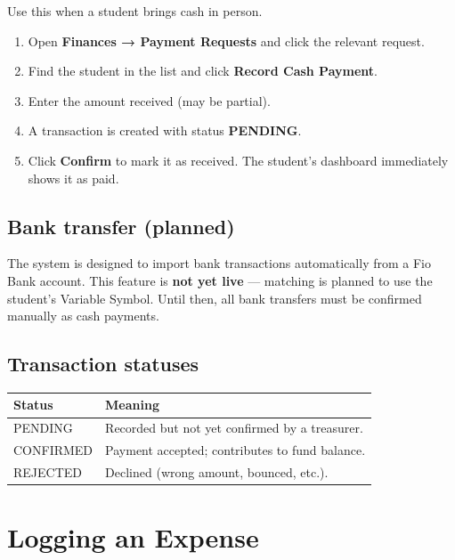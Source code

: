 \documentclass[a4paper,11pt]{article}
\begin{document}
Use this when a student brings cash in person.

\begin{enumerate}[noitemsep]
    \item Open \textbf{Finances → Payment Requests} and click the relevant
          request.
    \item Find the student in the list and click \textbf{Record Cash Payment}.
    \item Enter the amount received (may be partial).
    \item A transaction is created with status \textbf{PENDING}.
    \item Click \textbf{Confirm} to mark it as received.
          The student's dashboard immediately shows it as paid.
\end{enumerate}

\subsection{Bank transfer (planned)}

The system is designed to import bank transactions automatically from
a Fio Bank account. This feature is \textbf{not yet live} — matching is
planned to use the student's Variable Symbol.
Until then, all bank transfers must be confirmed manually as cash payments.

\subsection{Transaction statuses}

\begin{center}
\begin{tabular}{ll}
\toprule
Status & Meaning \\
\midrule
PENDING   & Recorded but not yet confirmed by a treasurer. \\
CONFIRMED & Payment accepted; contributes to fund balance. \\
REJECTED  & Declined (wrong amount, bounced, etc.). \\
\bottomrule
\end{tabular}
\end{center}

\section{Logging an Expense}
\end{document}

